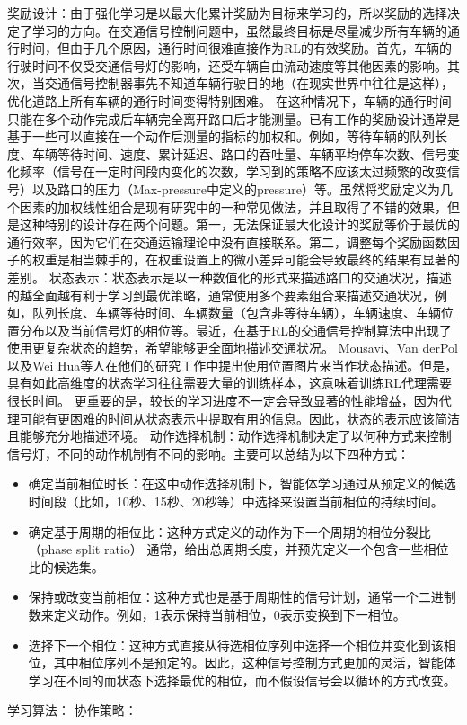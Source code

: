 奖励设计：由于强化学习是以最大化累计奖励为目标来学习的，所以奖励的选择决定了学习的方向。在交通信号控制问题中，虽然最终目标是尽量减少所有车辆的通行时间，但由于几个原因，通行时间很难直接作为RL的有效奖励。首先，车辆的行驶时间不仅受交通信号灯的影响，还受车辆自由流动速度等其他因素的影响。其次，当交通信号控制器事先不知道车辆行驶目的地（在现实世界中往往是这样），优化道路上所有车辆的通行时间变得特别困难。 在这种情况下，车辆的通行时间只能在多个动作完成后车辆完全离开路口后才能测量。已有工作的奖励设计通常是基于一些可以直接在一个动作后测量的指标的加权和。例如，等待车辆的队列长度、车辆等待时间、速度、累计延迟、路口的吞吐量、车辆平均停车次数、信号变化频率（信号在一定时间段内变化的次数，学习到的策略不应该太过频繁的改变信号）以及路口的压力（Max-pressure中定义的pressure）等。虽然将奖励定义为几个因素的加权线性组合是现有研究中的一种常见做法，并且取得了不错的效果，但是这种特别的设计存在两个问题。第一，无法保证最大化设计的奖励等价于最优的通行效率，因为它们在交通运输理论中没有直接联系。第二，调整每个奖励函数因子的权重是相当棘手的，在权重设置上的微小差异可能会导致最终的结果有显著的差别。
状态表示：状态表示是以一种数值化的形式来描述路口的交通状况，描述的越全面越有利于学习到最优策略，通常使用多个要素组合来描述交通状况，例如，队列长度、车辆等待时间、车辆数量（包含非等待车辆），车辆速度、车辆位置分布以及当前信号灯的相位等。最近，在基于RL的交通信号控制算法中出现了使用更复杂状态的趋势，希望能够更全面地描述交通状况。 Mousavi、Van derPol以及Wei Hua等人在他们的研究工作中提出使用位置图片来当作状态描述。但是，具有如此高维度的状态学习往往需要大量的训练样本，这意味着训练RL代理需要很长时间。 更重要的是，较长的学习进度不一定会导致显著的性能增益，因为代理可能有更困难的时间从状态表示中提取有用的信息。因此，状态的表示应该简洁且能够充分地描述环境。
动作选择机制：动作选择机制决定了以何种方式来控制信号灯，不同的动作机制有不同的影响。主要可以总结为以下四种方式：
\begin{itemize}
    \item 确定当前相位时长：在这中动作选择机制下，智能体学习通过从预定义的候选时间段（比如，10秒、15秒、20秒等）中选择来设置当前相位的持续时间。
    \item 确定基于周期的相位比：这种方式定义的动作为下一个周期的相位分裂比（phase split ratio） 通常，给出总周期长度，并预先定义一个包含一些相位比的候选集。
    \item 保持或改变当前相位：这种方式也是基于周期性的信号计划，通常一个二进制数来定义动作。例如，1表示保持当前相位，0表示变换到下一相位。
    \item 选择下一个相位：这种方式直接从待选相位序列中选择一个相位并变化到该相位，其中相位序列不是预定的。因此，这种信号控制方式更加的灵活，智能体学习在不同的而状态下选择最优的相位，而不假设信号会以循环的方式改变。
\end{itemize}
学习算法：
协作策略：
